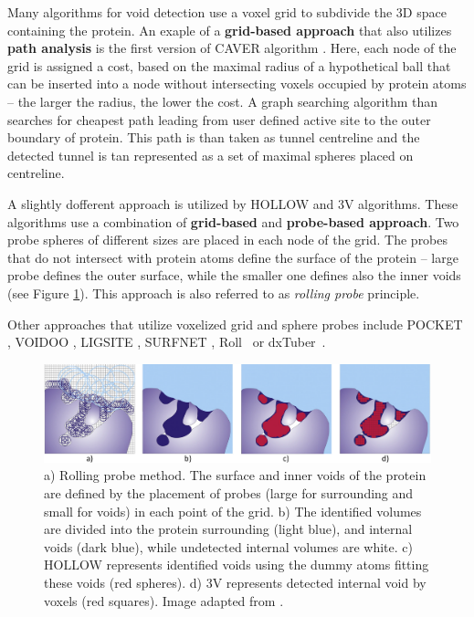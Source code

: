 Many algorithms for void detection use a voxel grid to subdivide the 3D space containing the protein. An exaple of a \textbf{grid-based approach} that also utilizes \textbf{path analysis} is the first version of CAVER algorithm \cite{Petrek2006Caver}. Here, each node of the grid is assigned a cost, based on the maximal radius of a hypothetical ball that can be inserted into a node without intersecting voxels occupied by protein atoms -- the larger the radius, the lower the cost. A graph searching algorithm than searches for cheapest path leading from user defined active site to the outer boundary of protein. This path is than taken as tunnel centreline and the detected tunnel is tan represented as a set of maximal spheres placed on centreline.

A slightly dofferent approach is utilized by HOLLOW \cite{Ho2008Hollow} and 3V \cite{voss20103v} algorithms. These algorithms use a combination of \textbf{grid-based} and \textbf{probe-based approach}. Two probe spheres of different sizes are placed in each node of the grid. The probes that do not intersect with protein atoms define the surface of the protein -- large probe defines the outer surface, while the smaller one defines also the inner voids (see Figure \ref{Fig:rollingprobe}). This approach is also referred to as \textit{rolling probe} principle.

Other approaches that utilize voxelized grid and sphere probes include POCKET \cite{levitt1992pocket}, VOIDOO \cite{kleywegt1994detection}, LIGSITE \cite{hendlich1997ligsite}, SURFNET \cite{laskowski1995surfnet}, Roll~\cite{yu2009roll} or dxTuber~\cite{raunest2011dxtuber}.

\begin{figure}[H]
  \centering
  \includegraphics[width=\linewidth]{pictures/rollingprobe.pdf} 
  \caption{a) Rolling probe method. The surface and inner voids of the protein are defined by the placement of probes (large for surrounding and small for voids) in each point of the grid. b) The identified volumes are divided into the protein surrounding (light blue), and internal voids (dark blue), while undetected internal volumes are white. c) HOLLOW represents identified voids using the dummy atoms fitting these voids (red spheres). d) 3V represents detected internal void by voxels (red squares). Image adapted from \cite{brezovsky2013software}.}
  \label{Fig:rollingprobe}  
\end{figure} 


